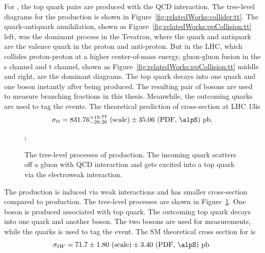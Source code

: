 \noindent For \ttbar, the top quark pairs are produced with the QCD interaction. The tree-level diagrams for the \ttbar production is shown in Figure~\ref{fig:relatedWorks:collider:tt}. The quark-antiquark annihilation, shown as Figure~\ref{fig:relatedWorks:ppCollision:tt} left, was the dominant process in the Tevatron, where the quark and antiquark are the valence quark in the proton and anti-proton. But in the LHC, which collides proton-proton at a higher center-of-mass energy, gluon-gluon fusion in the s channel and t channel, shown as  Figure~\ref{fig:relatedWorks:ppCollision:tt} middle and right, are the dominant diagrams. The top quark decays into one \PQb quark and one \PW boson instantly after being produced. The resulting pair of \PW bosons are used to measure \PW branching fractions in this thesis. Meanwhile, the outcoming \PQb quarks are used to tag the \ttbar events. The theoretical prediction of \ttbar cross-section at LHC 13\TeV is
\begin{equation}
    \sigma_{tt} = 831.76 ^{+19.77}_{-29.20}\text{~(scale)}\pm35.06 \text{~(PDF, \alpS)~pb} .
\end{equation}



\begin{figure}[ht]
    \centering
    ; \qquad
    \caption{The tree-level processes of \tW production. The incoming \PQb quark scatters off a gluon with QCD interaction and gets excited into a top quark via the electroweak interaction.}
    \label{fig:relatedWorks:ppCollision:tw}
\end{figure}

\noindent The \tW production is induced via weak interactions and has smaller cross-section compared to \ttbar production. The tree-level \tW processes are shown in Figure~\ref{fig:relatedWorks:ppCollision:tw}. One \PW boson is produced associated with top quark. The outcoming top quark decays into one \PQb quark and another \PW boson. The two \PW bosons are used for \PW measurements, while the \PQb quarks is used to tag the \tW event. The SM theoretical cross section for \tW is 
\begin{equation}
    \sigma_{tW} = 71.7 \pm 1.80 \text{~(scale)} \pm 3.40 \text{~(PDF, \alpS)~pb }
\end{equation}


